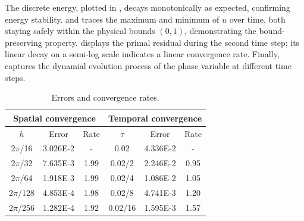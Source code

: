 The discrete energy, plotted in , decays monotonically as expected, confirming energy stability.
 and  traces the maximum and minimum of $u$ over time, both staying safely within the physical bounds $(0,1)$, demonstrating the bound-preserving property. 
 displays the primal residual during the second time step; 
its linear decay on a semi-log scale indicates a linear convergence rate.
Finally,  captures the dynamial evolution process of the phase variable at different time steps.
\begin{table}
    \centering
    \begin{tabular}{|c|c|c||c|c|c|}
    \hline
    \multicolumn{3}{|c||}{Spatial convergence}  & \multicolumn{3}{|c|}{Temporal convergence} \\
    \hline
    $h$&Error&Rate&$\tau$&Error&Rate\\
    \hline
    2$\pi$/16&3.026E-2&-&0.02&4.336E-2&-\\
    \hline
    2$\pi$/32&7.635E-3&1.99&0.02/2&2.246E-2&0.95\\
    \hline
    2$\pi$/64&1.918E-3&1.99&0.02/4&1.086E-2&1.05\\  
    \hline
    2$\pi$/128&4.853E-4&1.98&0.02/8&4.741E-3&1.20\\
    \hline
    2$\pi$/256&1.282E-4&1.92&0.02/16&1.595E-3&1.57\\
    \hline

    \end{tabular}
    \caption{Errors and convergence rates.}
    \label{ta:rate}
\end{table}


